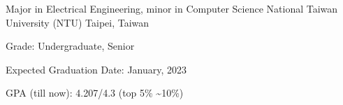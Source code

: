 

\begin{cventries}

  \cventry
    {Major in Electrical Engineering, minor in Computer Science} %
    {National Taiwan University (NTU)} %
    {Taipei, Taiwan} %
    {} %
    {
      \begin{cvitems} %
        \item {Grade: Undergraduate, Senior}
        \item {Expected Graduation Date: January, 2023}
        \item {GPA (till now): 4.207/4.3 (top 5\% \textasciitilde 10\%)}
      \end{cvitems}
    }

\end{cventries}
